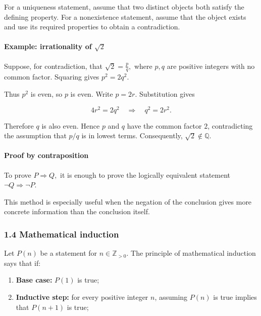 \documentclass[11pt,a4paper]{article}
\begin{document}
For a uniqueness statement, assume that two distinct objects both
satisfy the defining property. For a nonexistence statement, assume that
the object exists and use its required properties to obtain a
contradiction.

\paragraph{\texorpdfstring{Example: irrationality of
\(\sqrt2\)}{Example: irrationality of \textbackslash sqrt2}}\label{example-irrationality-of-sqrt2}

Suppose, for contradiction, that \(\sqrt2=\frac{p}{q},\) where \(p,q\)
are positive integers with no common factor. Squaring gives
\(p^2=2q^2.\)

Thus \(p^2\) is even, so \(p\) is even. Write \(p=2r\). Substitution
gives

\[
4r^2=2q^2
\quad\Longrightarrow\quad
q^2=2r^2.
\]

Therefore \(q\) is also even. Hence \(p\) and \(q\) have the common
factor \(2\), contradicting the assumption that \(p/q\) is in lowest
terms. Consequently, \(\sqrt2\notin\mathbb{Q}.\)

\paragraph{Proof by contraposition}\label{proof-by-contraposition}

To prove \(P\Rightarrow Q,\) it is enough to prove the logically
equivalent statement \(\neg Q\Rightarrow\neg P.\)

This method is especially useful when the negation of the conclusion
gives more concrete information than the conclusion itself.

\subsubsection{1.4 Mathematical induction}\label{mathematical-induction}

Let \(P(n)\) be a statement for \(n\in\mathbb{Z}_{>0}\). The principle
of mathematical induction says that if:

\begin{enumerate}
\def\labelenumi{\arabic{enumi}.}
\item
  \textbf{Base case:} \(P(1)\) is true;
\item
  \textbf{Inductive step:} for every positive integer \(n\), assuming
  \(P(n)\) is true implies that \(P(n+1)\) is true;
\end{enumerate}
\end{document}
